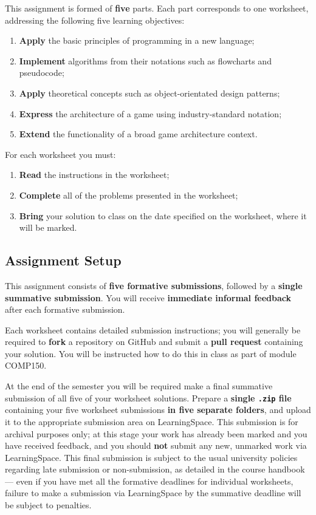 \documentclass{../fal_assignment}
\begin{document}
This assignment is formed of \textbf{five} parts.
Each part corresponds to one worksheet, addressing the following five learning objectives:
\begin{enumerate}[label=(\Alph*)]
	\item \textbf{Apply} the basic principles of programming in a new language;
	\item \textbf{Implement} algorithms from their notations such as flowcharts and pseudocode;
	\item \textbf{Apply} theoretical concepts such as object-orientated design patterns;
	\item \textbf{Express} the architecture of a game using industry-standard notation;
	\item \textbf{Extend} the functionality of a broad game architecture context.
\end{enumerate}

For each worksheet you must:
\begin{enumerate}[label=(\roman*)]
    \item \textbf{Read} the instructions in the worksheet;
    \item \textbf{Complete} all of the problems presented in the worksheet;
    \item \textbf{Bring} your solution to class on the date specified on the worksheet,
    	where it will be marked.
\end{enumerate}

\subsection*{Assignment Setup}

This assignment consists of \textbf{five formative submissions}, followed by a \textbf{single summative submission}.
You will receive \textbf{immediate informal feedback} after each formative submission.

Each worksheet contains detailed submission instructions; you will generally be required to \textbf{fork} a repository on GitHub and submit a \textbf{pull request} containing your solution. You will be instructed how to do this in class as part of module COMP150.

At the end of the semester you will be required make a final summative submission of all five of your worksheet solutions.
Prepare a \textbf{single \texttt{.zip} file} containing your five worksheet submissions \textbf{in five separate folders}, and upload it to the appropriate submission area on LearningSpace.
This submission is for archival purposes only; at this stage your work has already been marked and you have received feedback, and you should \textbf{not} submit any new, unmarked work via LearningSpace.
This final submission is subject to the usual university policies regarding late submission or non-submission,
as detailed in the course handbook ---
even if you have met all the formative deadlines for individual worksheets,
failure to make a submission via LearningSpace by the summative deadline will be subject to penalties.
\end{document}
